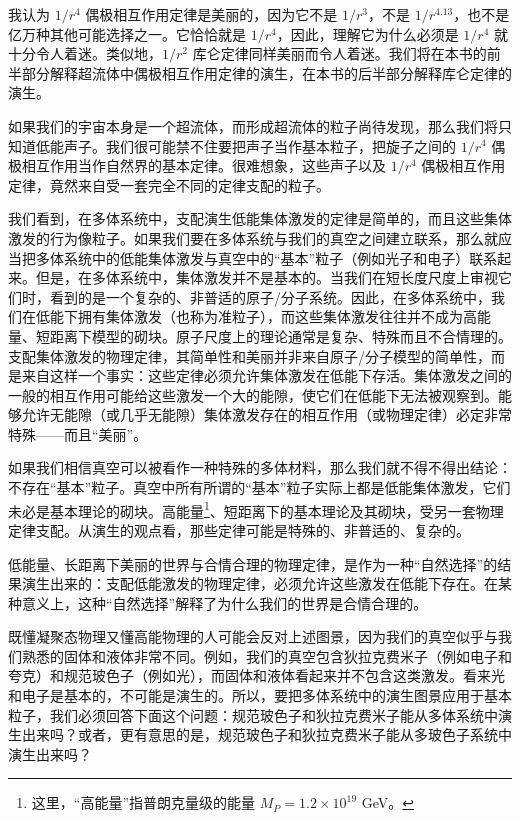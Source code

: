 我认为 $1/r^4$ 偶极相互作用定律是美丽的，因为它不是 $1/r^3$，不是 $1/r^{4.13}$，也不是亿万种其他可能选择之一。它恰恰就是 $1/r^4$，因此，理解它为什么必须是 $1/r^4$ 就十分令人着迷。类似地，$1/r^2$ 库仑定律同样美丽而令人着迷。我们将在本书的前半部分解释超流体中偶极相互作用定律的演生，在本书的后半部分解释库仑定律的演生。

如果我们的宇宙本身是一个超流体，而形成超流体的粒子尚待发现，那么我们将只知道低能声子。我们很可能禁不住要把声子当作基本粒子，把旋子之间的 $1/r^4$ 偶极相互作用当作自然界的基本定律。很难想象，这些声子以及 $1/r^4$ 偶极相互作用定律，竟然来自受一套完全不同的定律支配的粒子。

我们看到，在多体系统中，支配演生低能集体激发的定律是简单的，而且这些集体激发的行为像粒子。如果我们要在多体系统与我们的真空之间建立联系，那么就应当把多体系统中的低能集体激发与真空中的“基本”粒子（例如光子和电子）联系起来。但是，在多体系统中，集体激发并不是基本的。当我们在短长度尺度上审视它们时，看到的是一个复杂的、非普适的原子/分子系统。因此，在多体系统中，我们在低能下拥有集体激发（也称为准粒子），而这些集体激发往往并不成为高能量、短距离下模型的砌块。原子尺度上的理论通常是复杂、特殊而且不合情理的。支配集体激发的物理定律，其简单性和美丽并非来自原子/分子模型的简单性，而是来自这样一个事实：这些定律必须允许集体激发在低能下存活。集体激发之间的一般的相互作用可能给这些激发一个大的能隙，使它们在低能下无法被观察到。能够允许无能隙（或几乎无能隙）集体激发存在的相互作用（或物理定律）必定非常特殊——而且“美丽”。

如果我们相信真空可以被看作一种特殊的多体材料，那么我们就不得不得出结论：不存在“基本”粒子。真空中所有所谓的“基本”粒子实际上都是低能集体激发，它们未必是基本理论的砌块。高能量\footnote{这里，“高能量”指普朗克量级的能量 $M_P=1.2\times10^{19}$ GeV。}、短距离下的基本理论及其砌块，受另一套物理定律支配。从演生的观点看，那些定律可能是特殊的、非普适的、复杂的。

低能量、长距离下美丽的世界与合情合理的物理定律，是作为一种“自然选择”的结果演生出来的：支配低能激发的物理定律，必须允许这些激发在低能下存在。在某种意义上，这种“自然选择”解释了为什么我们的世界是合情合理的。

既懂凝聚态物理又懂高能物理的人可能会反对上述图景，因为我们的真空似乎与我们熟悉的固体和液体非常不同。例如，我们的真空包含狄拉克费米子（例如电子和夸克）和规范玻色子（例如光），而固体和液体看起来并不包含这类激发。看来光和电子是基本的，不可能是演生的。所以，要把多体系统中的演生图景应用于基本粒子，我们必须回答下面这个问题：规范玻色子和狄拉克费米子能从多体系统中演生出来吗？或者，更有意思的是，规范玻色子和狄拉克费米子能从多玻色子系统中演生出来吗？

